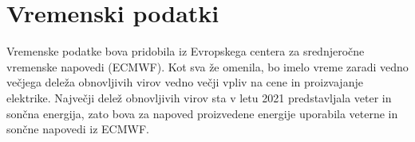 \documentclass[12pt,a4paper]{amsart}
\theoremstyle{definition} %
\theoremstyle{plain} %
\begin{document}
{\section*{Vremenski podatki}

Vremenske podatke bova pridobila iz Evropskega centera za srednjeročne vremenske napovedi (ECMWF). Kot sva že omenila, bo imelo vreme zaradi vedno večjega deleža obnovljivih virov vedno večji vpliv na cene in proizvajanje elektrike. 
Največji delež obnovljivih virov sta v letu 2021 predstavljala veter in sončna energija, zato bova za napoved proizvedene energije uporabila veterne in sončne napovedi iz ECMWF.

}
\end{document}

